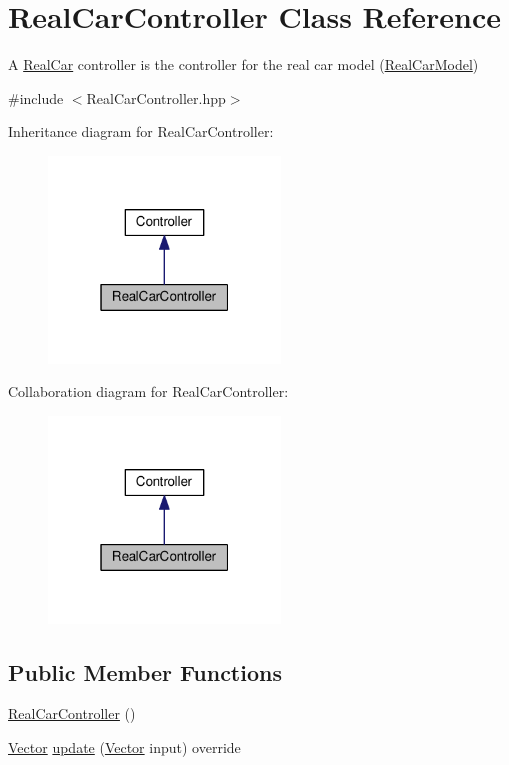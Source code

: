 \hypertarget{classRealCarController}{}\section{Real\+Car\+Controller Class Reference}
\label{classRealCarController}


A \hyperlink{classRealCar}{Real\+Car} controller is the controller for the real car model (\hyperlink{classRealCarModel}{Real\+Car\+Model})  




{\ttfamily \#include $<$Real\+Car\+Controller.\+hpp$>$}



Inheritance diagram for Real\+Car\+Controller\+:\nopagebreak
\begin{figure}[H]
\begin{center}
\leavevmode
\includegraphics[width=175pt]{classRealCarController__inherit__graph}
\end{center}
\end{figure}


Collaboration diagram for Real\+Car\+Controller\+:\nopagebreak
\begin{figure}[H]
\begin{center}
\leavevmode
\includegraphics[width=175pt]{classRealCarController__coll__graph}
\end{center}
\end{figure}
\subsection*{Public Member Functions}
\begin{DoxyCompactItemize}
\item 
\hyperlink{classRealCarController_a475547f4307d78b33577d17a7b094363}{Real\+Car\+Controller} ()
\item 
\hyperlink{Agent_8hpp_a5dd127bb3cb18b011cf5fd80a906e830}{Vector} \hyperlink{classRealCarController_a639c0c911bbfc63ce90f9de2b8a9be4d}{update} (\hyperlink{Agent_8hpp_a5dd127bb3cb18b011cf5fd80a906e830}{Vector} input) override
\end{DoxyCompactItemize}
